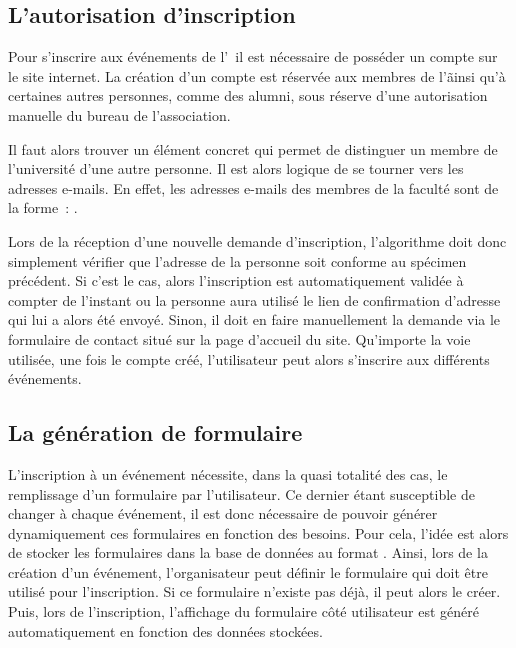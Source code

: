 \subsection{L'autorisation d'inscription}
\label{subsec:autorisation-inscription}

Pour s'inscrire aux événements de l'\ofni\, il est nécessaire de posséder un compte sur le site internet. La création d'un compte est réservée aux membres de l'\univ\~ ainsi qu'à certaines autres personnes, comme des alumni, sous réserve d'une autorisation manuelle du bureau de l'association.

Il faut alors trouver un élément concret qui permet de distinguer un membre de l'université d'une autre personne. Il est alors logique de se tourner vers les adresses e-mails. En effet, les adresses e-mails des membres de la faculté sont de la forme~: .

Lors de la réception d'une nouvelle demande d'inscription, l'algorithme doit donc simplement vérifier que l'adresse  de la personne soit conforme au spécimen précédent. Si c'est le cas, alors l'inscription est automatiquement validée à compter de l'instant ou la personne aura utilisé le lien de confirmation d'adresse qui lui a alors été envoyé. Sinon, il doit en faire manuellement la demande via le formulaire de contact situé sur la page d'accueil du site. Qu'importe la voie utilisée, une fois le compte créé, l'utilisateur peut alors s'inscrire aux différents événements.

\subsection{La génération de formulaire}
\label{subsec:generation-formulaire}

L'inscription à un événement nécessite, dans la quasi totalité des cas, le remplissage d'un formulaire par l'utilisateur. Ce dernier étant susceptible de changer à chaque événement, il est donc nécessaire de pouvoir générer dynamiquement ces formulaires en fonction des besoins. Pour cela, l'idée est alors de stocker les formulaires dans la base de données au format . Ainsi, lors de la création d'un événement, l'organisateur peut définir le formulaire qui doit être utilisé pour l'inscription. Si ce formulaire n'existe pas déjà, il peut alors le créer. Puis, lors de l'inscription, l'affichage du formulaire côté utilisateur est généré automatiquement en fonction des données stockées.

